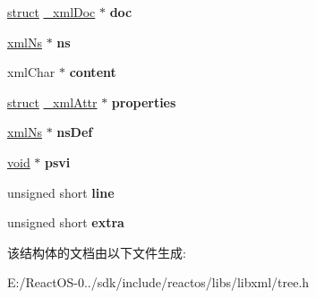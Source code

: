 \begin{DoxyCompactItemize}
\item 
\mbox{\label{struct__xml_node_a5b43d2951be50d7c213db8f6bea15759}} 
\hyperlink{interfacestruct}{struct} \hyperlink{struct__xml_doc}{\+\_\+xml\+Doc} $\ast$ {\bfseries doc}
\item 
\mbox{\label{struct__xml_node_af902f75a3ca0a4625af1522fa949ae4a}} 
\hyperlink{struct__xml_ns}{xml\+Ns} $\ast$ {\bfseries ns}
\item 
\mbox{\label{struct__xml_node_a1bc96a50324a7fde5c8f35329c9ab53d}} 
xml\+Char $\ast$ {\bfseries content}
\item 
\mbox{\label{struct__xml_node_a983dfbbe2329d6c47fcbd8a3ca492e70}} 
\hyperlink{interfacestruct}{struct} \hyperlink{struct__xml_attr}{\+\_\+xml\+Attr} $\ast$ {\bfseries properties}
\item 
\mbox{\label{struct__xml_node_a64d3a0e8e175d8d9b375ed320fe6d667}} 
\hyperlink{struct__xml_ns}{xml\+Ns} $\ast$ {\bfseries ns\+Def}
\item 
\mbox{\label{struct__xml_node_a5215b42de79182852eecccec81cf362d}} 
\hyperlink{interfacevoid}{void} $\ast$ {\bfseries psvi}
\item 
\mbox{\label{struct__xml_node_a77056812e9fe4c79ba512abbccb6c4f9}} 
unsigned short {\bfseries line}
\item 
\mbox{\label{struct__xml_node_a3e7aea99703e467874ce62cff3038f5b}} 
unsigned short {\bfseries extra}
\end{DoxyCompactItemize}


该结构体的文档由以下文件生成\+:\begin{DoxyCompactItemize}
\item 
E\+:/\+React\+O\+S-\/0../sdk/include/reactos/libs/libxml/tree.\+h\end{DoxyCompactItemize}
